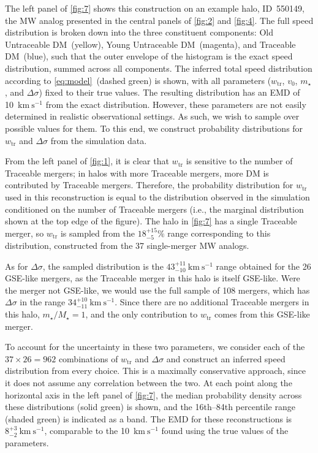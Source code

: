 \documentclass[twocolumn,tighten,twocolappendix]{aastex701}
\newcommand{\ftr}{\ensuremath{w_\mathrm{tr}}}
\newcommand{\Mstar}{\ensuremath{M_\star}}
\newcommand{\kms}{\ensuremath{\text{km}~\text{s}^{-1}}}
\begin{document}
The left panel of \autoref{fig:7} shows this construction on an example halo, ID~550149, the MW analog presented in the central panels of \autoref{fig:2} and \autoref{fig:4}. The full speed  distribution is broken down into the three constituent components: Old Untraceable DM~(yellow), Young Untraceable DM~(magenta), and Traceable DM~(blue), such that the outer envelope of the histogram is the exact speed distribution, summed across all components. The inferred total speed distribution according to \autoref{eq:model}~(dashed green) is shown, with all parameters (\ftr{}, $v_0$, $m_\star$, and $\Delta\sigma$) fixed to their true values. The resulting distribution has an EMD of 10~\kms{} from the exact distribution. However, these parameters are not easily determined in realistic observational settings. As such, we wish to sample over possible values for them. To this end, we construct probability distributions for $\ftr$ and $\Delta\sigma$ from the simulation data. 

From the left panel of \autoref{fig:1}, it is clear that \ftr{} is sensitive to the number of Traceable mergers; in halos with more Traceable mergers, more DM is contributed by Traceable mergers. Therefore, the probability distribution for \ftr{} used in this reconstruction is equal to the distribution observed in the simulation conditioned on the number of Traceable mergers (i.e., the marginal distribution shown at the top edge of the figure). The halo in \autoref{fig:7} has a single Traceable merger, so \ftr{} is sampled from the $18^{+15}_{-5}\%$ range corresponding to this distribution, constructed from the 37 single-merger MW analogs.

As for $\Delta\sigma$, the sampled distribution is the $43_{-10}^{+11}~\kms$ range obtained for the 26 GSE-like mergers, as the Traceable merger in this halo is itself GSE-like. Were the merger not GSE-like, we would use the full sample of 108 mergers, which has  $\Delta\sigma$ in the range $34_{-11}^{+10}~\kms$. Since there are no additional Traceable mergers in this halo, $m_\star/\Mstar = 1$, and the only contribution to \ftr{} comes from this GSE-like merger.

To account for the uncertainty in these two parameters, we consider each of the $37\times 26 = 962$ combinations of \ftr{} and $\Delta\sigma$ and construct an inferred speed distribution from every choice. This is a maximally conservative approach, since it does not assume any correlation between the two. At each point along the horizontal axis in the left panel of \autoref{fig:7}, the median probability density across these distributions (solid green) is shown, and the 16th--84th percentile range (shaded green) is indicated as a band. The EMD for these reconstructions is $8^{+3}_{-2}~\kms{}$, comparable to the 10~\kms{} found using the true values of the parameters.
\end{document}
